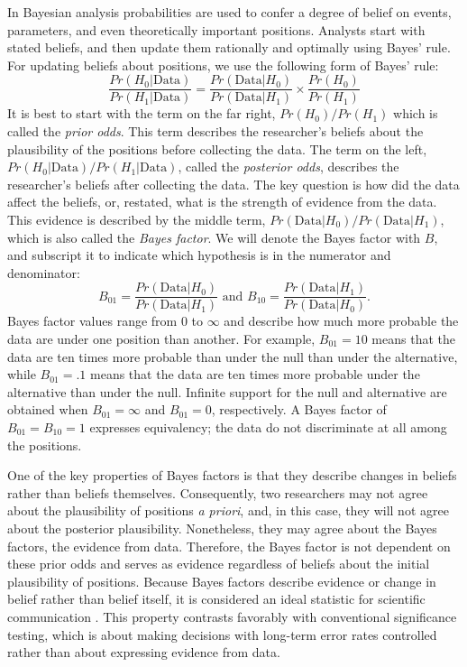 \documentclass[man]{apa6}
\begin{document}
\nocite{Laplace:1986,Morey:Rouder:2014}

In Bayesian analysis probabilities are used to confer a degree of belief on events, parameters, and even theoretically important positions.  Analysts start with stated beliefs, and then update them rationally and optimally using Bayes' rule.  For updating beliefs about positions, we use the following form of Bayes' rule:
\begin{equation}
\frac{Pr(H_0 | \mbox{Data})}{Pr(H_1 | \mbox{Data})} = \frac{Pr(\mbox{Data} | H_0)}{Pr(\mbox{Data} | H_1)} \times \frac{Pr(H_0)}{Pr (H_1)} 
\end{equation}
It is best to start with the term on the far right, $Pr(H_0)/Pr(H_1)$ which is called the {\em prior odds}.  This term describes the researcher's beliefs about the plausibility of the positions before collecting the data.  The term on the left, $Pr(H_0 | \mbox{Data})/Pr(H_1 | \mbox{Data})$, called the {\em posterior odds}, describes the researcher's beliefs after collecting the data.   The key question is how did the data affect the beliefs, or, restated, what is the strength of evidence from the data.  This evidence is described by the middle term,  $Pr(\mbox{Data} | H_0)/Pr(\mbox{Data} | H_1)$, which is also called the {\em Bayes factor}.  We will denote the Bayes factor with $B$, and subscript it to indicate which hypothesis is in the numerator and denominator:
\[
B_{01} = \frac{Pr(\mbox{Data} | H_0)}{Pr(\mbox{Data} | H_1)} \mbox{ and } B_{10} = \frac{Pr(\mbox{Data} | H_1)}{Pr(\mbox{Data} | H_0)}.
\]
Bayes factor values range from 0 to $\infty$ and describe how much more probable the data are under one position than another.  For example, $B_{01}=10$ means that the data are ten times more probable than under the null than under the alternative, while $B_{01}=.1$ means that the data are ten times more probable under the alternative than under the null.  Infinite support for the null and alternative are obtained when $B_{01}=\infty$ and $B_{01}=0$, respectively.  A Bayes factor of $B_{01}=B_{10}=1$ expresses equivalency; the data do not discriminate at all among the positions.

One of the key properties of Bayes factors is that they describe changes in beliefs rather than beliefs themselves.  Consequently, two researchers may not agree about the plausibility of positions {\em a priori}, and, in this case, they will not agree about the posterior plausibility.  Nonetheless, they may agree about the Bayes factors, the evidence from data.  Therefore, the Bayes factor is not dependent on these prior odds and serves as evidence regardless of beliefs about the initial plausibility of positions.  Because Bayes factors describe evidence or change in belief rather than belief itself, it is considered an ideal statistic for scientific communication \citep{Jeffreys:1961}.  This property contrasts favorably with conventional significance testing, which is about making decisions with long-term error rates controlled rather than about expressing evidence from data. 
\end{document}
